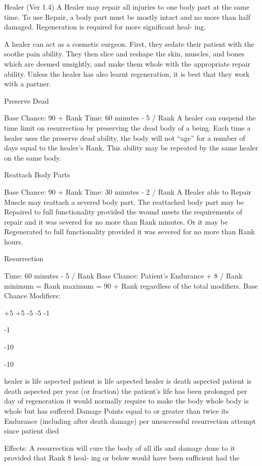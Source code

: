 \begin{Chapter}{Healer (Ver 1.4)}
A Healer may repair all injuries to one body part at 
the same time. To use Repair, a body part must be 
mostly  intact  and  no  more  than  half  damaged. 
Regeneration is required for more significant heal-
ing. 

A healer can act as a cosmetic surgeon. First, they 
sedate  their  patient  with  the  soothe  pain  ability. 
They then slice and reshape the skin, muscles, and 
bones which are deemed unsightly, and make them 
whole  with  the  appropriate  repair  ability.  Unless 
the  healer  has  also  learnt  regeneration,  it  is  best 
that they work with a partner. 

Preserve Dead 

Base Chance: 90 + Rank 
Time: 60 minutes - 5 / Rank 
A healer can suspend the time limit on resurrection 
by preserving the dead body of a being. Each time 
a  healer  uses  the  preserve  dead  ability,  the  body 
will  not  “age”  for  a  number  of  days  equal  to  the 
healer’s Rank. This ability may be repeated by the 
same healer on the same body. 

Reattach Body Parts 

Base Chance: 90 + Rank 
Time: 30 minutes - 2 / Rank 
A  Healer  able  to  Repair  Muscle  may  reattach  a 
severed  body  part.  The  reattached  body  part  may 
be  Repaired  to  full  functionality  provided  the 
wound meets the requirements of repair and it was 
severed for no more than Rank minutes. Or it may 
be Regenerated to full functionality provided it was 
severed for no more than Rank hours. 

Resurrection 

Time: 60 minutes - 5 / Rank 
Base Chance: Patient’s Endurance + 8 / Rank  
minimum = Rank  
maximum = 90 + Rank  
regardless of the total modifiers. 
Base Chance Modifiers: 

+5 
+5 
-5 
-5 
-1 

-1 

-10 

-10 

healer is life aspected 
patient is life aspected 
healer is death aspected 
patient is death aspected 
per year (or fraction) the patient’s life has 
been prolonged 
per day of regeneration it would normally 
require to make the body whole 
body is whole but has suffered Damage 
Points equal to or greater than twice its 
Endurance (including after death damage) 
per unsuccessful resurrection attempt since 
patient died 

Effects: A resurrection will cure the body of all ills 
and  damage  done  to  it  provided  that  Rank  8  heal-
ing  or  below  would  have  been  sufficient  had  the 


\end{Chapter}
